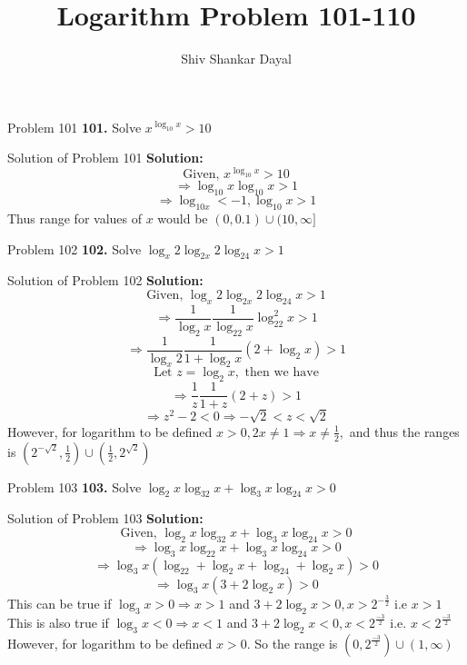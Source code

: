 \documentclass[aspectratio=169,8pt]{beamer}
\title{Logarithm Problem 101-110}
\author[Shiv Shankar Dayal]{Shiv Shankar Dayal}
\begin{document}
\begin{frame}
  \titlepage
\end{frame}
\begin{frame}{Problem 101}
  \textbf{101.} Solve $x^{\log_{10}x} > 10$
\end{frame}
\begin{frame}{Solution of Problem 101}
  \textbf{Solution:} $$\text{Given,~}x^{\log_{10}x} > 10$$
  $$\Rightarrow \log_{10}x\log_{10}x > 1$$
  $$\Rightarrow \log_{10x} < -1, \log_{10}x > 1$$
  Thus range for values of $x$ would be $(0, 0.1)\cup(10, \infty]$
\end{frame}
\begin{frame}{Problem 102}
  \textbf{102.} Solve $\log_x2\log_{2x}2\log_24x > 1$
\end{frame}
\begin{frame}{Solution of Problem 102}
  \textbf{Solution:} $$\text{Given,~}\log_x2\log_{2x}2\log_24x > 1$$
  $$\Rightarrow \frac{1}{\log_2x}\frac{1}{\log_22x}\log_22^2x > 1$$
  $$\Rightarrow \frac{1}{\log_x2}\frac{1}{1 + \log_2x}(2 + \log_2x) > 1$$
  $$\text{Let~}z = \log_2x, \text{~then we have}$$
  $$\Rightarrow \frac{1}{z}\frac{1}{1 + z}(2 + z) > 1$$
  $$\Rightarrow z^2 - 2 < 0\Rightarrow -\sqrt{2} <z < \sqrt{2}$$
  However, for logarithm to be defined $x > 0, 2x \neq 1 \Rightarrow x\neq \frac{1}{2},$ and thus the ranges is $(2^{-\sqrt{2}}, \frac{1}{2})\cup(\frac{1}{2}, 2^{\sqrt{2}})$
\end{frame}
\begin{frame}{Problem 103}
  \textbf{103.} Solve $\log_2x\log_32x + \log_3x\log_24x > 0$
\end{frame}
\begin{frame}{Solution of Problem 103}
  \textbf{Solution:} $$\text{Given,~}\log_2x\log_32x + \log_3x\log_24x > 0$$
  $$\Rightarrow \log_3x\log_22x + \log_3x\log_24x > 0$$
  $$\Rightarrow \log_3x(\log_22 + \log_2x + \log_24 + \log_2x) > 0$$
  $$\Rightarrow \log_3x(3 + 2\log_2x) > 0$$
  This can be true if $\log_3x > 0\Rightarrow x > 1$ and $3 + 2\log_2x > 0, x > 2^{-\frac{3}{2}}$ i.e $x > 1$
  \linebreak\linebreak
  This is also true if $\log_3x < 0 \Rightarrow x < 1$ and $3 + 2\log_2x < 0, x < 2^{\frac{-3}{2}}$ i.e. $x < 2^{\frac{-3}{2}}$
  \linebreak\linebreak
  However, for logarithm to be defined $x > 0.$
  \linebreak\linebreak
  So the range is $(0, 2^{\frac{-3}{2}})\cup (1, \infty)$
\end{frame}
\end{document}
